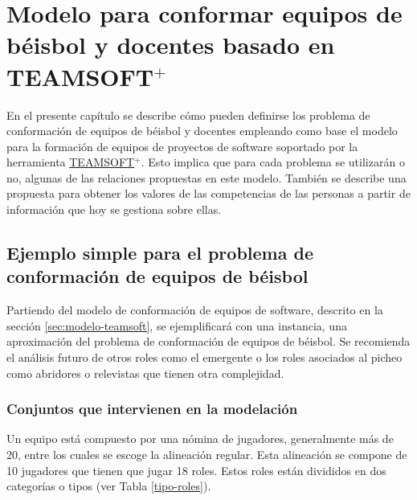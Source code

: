 \chapter{Modelo para conformar equipos de béisbol y docentes basado en TEAMSOFT$^+$}\label{chap:2}

En el presente capítulo se describe cómo pueden definirse los problema de conformación de equipos de béisbol y docentes empleando como base el modelo para la formación de equipos de proyectos de software soportado por la herramienta \hyperref[sec:modelo-teamsoft]{TEAMSOFT$^+.$} Esto implica que para cada problema se utilizarán o no, algunas de las relaciones propuestas en este modelo. También se describe una propuesta para obtener los valores de las competencias de las personas a partir de información que hoy se gestiona sobre ellas.

\section{Ejemplo simple para el problema de conformación de equipos de béisbol}\label{ejemplo-pel}

Partiendo del modelo de conformación de equipos de software, descrito en la sección \ref{sec:modelo-teamsoft}, se ejemplificará con una instancia, una aproximación del problema de conformación de equipos de béisbol. Se recomienda el análisis futuro de otros roles como el emergente o los roles asociados al picheo como abridores o relevistas que tienen otra complejidad.

\subsection{Conjuntos que intervienen en la modelación}\label{sec:conjuntos}
Un equipo está compuesto por una nómina de jugadores, generalmente más de 20, entre los cuales se escoge la alineación regular. Esta alineación se compone de 10 jugadores que tienen que jugar 18 roles. Estos roles están divididos en dos categorías o tipos (ver Tabla \ref{tipo-roles}).

